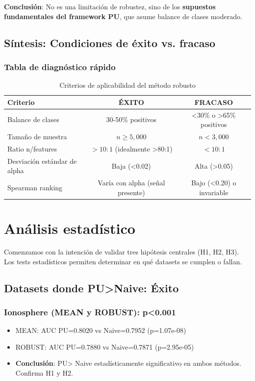 \documentclass[a4paper,11pt]{article}
\begin{document}
\textbf{Conclusión}: No es una limitación de robustez, sino de los \textbf{supuestos fundamentales del framework PU}, que asume balance de clases moderado.

\subsection{Síntesis: Condiciones de éxito vs. fracaso}

\subsubsection{Tabla de diagnóstico rápido}

\begin{table}[H]
\centering
\caption{Criterios de aplicabilidad del método robusto}
\begin{tabular}{lcc}
\toprule
\textbf{Criterio} & \textbf{ÉXITO} & \textbf{FRACASO} \\
\midrule
Balance de clases & 30-50\% positivos & <30\% o >65\% positivos \\
Tamaño de muestra & $n \geq 5{,}000$ & $n < 3{,}000$ \\
Ratio n/features & $> 10:1$ (idealmente >80:1) & $< 10:1$ \\
Desviación estándar de alpha & Baja (<0.02) & Alta (>0.05) \\
Spearman ranking & Varía con alpha (señal presente) & Bajo (<0.20) o invariable \\
\bottomrule
\end{tabular}
\end{table}


\section{Análisis estadístico}

Comenzamos con la intención de validar tres hipótesis centrales (H1, H2, H3). Los tests estadísticos permiten determinar en qué datasets se cumplen o fallan.

\subsection{Datasets donde PU>Naive: Éxito}

\subsubsection{Ionosphere (MEAN y ROBUST): p<0.001}
\begin{itemize}
    \item MEAN: AUC PU=0.8020 vs Naive=0.7952 (p=1.07e-08)
    \item ROBUST: AUC PU=0.7880 vs Naive=0.7871 (p=2.95e-05)
    \item \textbf{Conclusión}: PU> Naive estadísticamente significativo en ambos métodos. Confirma H1 y H2.
\end{itemize}
\end{document}

